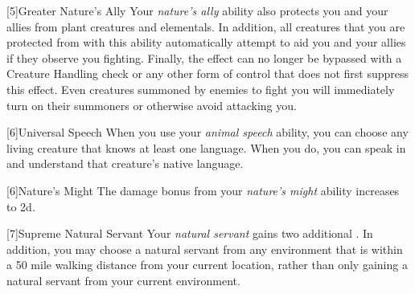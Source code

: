         [5]{Greater Nature's Ally} Your \textit{nature's ally} ability also protects you and your allies from plant creatures and elementals.
        In addition, all creatures that you are protected from with this ability automatically attempt to aid you and your allies if they observe you fighting.
        Finally, the effect can no longer be bypassed with a Creature Handling check or any other form of control that does not first suppress this effect.
        Even creatures summoned by enemies to fight you will immediately turn on their summoners or otherwise avoid attacking you.

        [6]{Universal Speech} When you use your \textit{animal speech} ability, you can choose any living creature that knows at least one language.
        When you do, you can speak in and understand that creature's native language.

        [6]{Nature's Might} The damage bonus from your \textit{nature's might} ability increases to \plus2d.

        [7]{Supreme Natural Servant} Your \textit{natural servant} gains two additional .
        In addition, you may choose a natural servant from any environment that is within a 50 mile walking distance from your current location, rather than only gaining a natural servant from your current environment.

